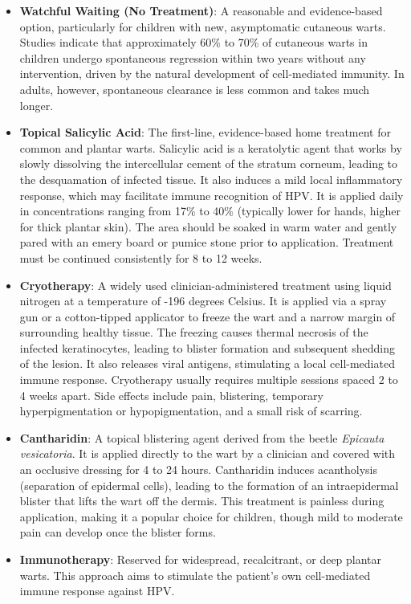 \begin{itemize}
    \item \textbf{Watchful Waiting (No Treatment)}: A reasonable and evidence-based option, particularly for children with new, asymptomatic cutaneous warts. Studies indicate that approximately 60\% to 70\% of cutaneous warts in children undergo spontaneous regression within two years without any intervention, driven by the natural development of cell-mediated immunity. In adults, however, spontaneous clearance is less common and takes much longer.
    \item \textbf{Topical Salicylic Acid}: The first-line, evidence-based home treatment for common and plantar warts. Salicylic acid is a keratolytic agent that works by slowly dissolving the intercellular cement of the stratum corneum, leading to the desquamation of infected tissue. It also induces a mild local inflammatory response, which may facilitate immune recognition of HPV. It is applied daily in concentrations ranging from 17\% to 40\% (typically lower for hands, higher for thick plantar skin). The area should be soaked in warm water and gently pared with an emery board or pumice stone prior to application. Treatment must be continued consistently for 8 to 12 weeks.
    \item \textbf{Cryotherapy}: A widely used clinician-administered treatment using liquid nitrogen at a temperature of -196 degrees Celsius. It is applied via a spray gun or a cotton-tipped applicator to freeze the wart and a narrow margin of surrounding healthy tissue. The freezing causes thermal necrosis of the infected keratinocytes, leading to blister formation and subsequent shedding of the lesion. It also releases viral antigens, stimulating a local cell-mediated immune response. Cryotherapy usually requires multiple sessions spaced 2 to 4 weeks apart. Side effects include pain, blistering, temporary hyperpigmentation or hypopigmentation, and a small risk of scarring.
    \item \textbf{Cantharidin}: A topical blistering agent derived from the beetle \textit{Epicauta vesicatoria}. It is applied directly to the wart by a clinician and covered with an occlusive dressing for 4 to 24 hours. Cantharidin induces acantholysis (separation of epidermal cells), leading to the formation of an intraepidermal blister that lifts the wart off the dermis. This treatment is painless during application, making it a popular choice for children, though mild to moderate pain can develop once the blister forms.
    \item \textbf{Immunotherapy}: Reserved for widespread, recalcitrant, or deep plantar warts. This approach aims to stimulate the patient's own cell-mediated immune response against HPV.

\end{itemize}
